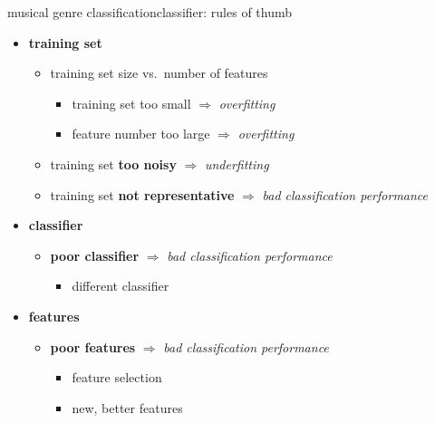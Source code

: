         \begin{frame}{musical genre classification}{classifier: rules of thumb}
            \begin{itemize}
                \item   \textbf{training set}
                    \begin{itemize}
                        \item	training set size vs.\ number of features
                            \begin{itemize}
                                \item	training set too small $\Rightarrow$ \textit{overfitting}
                                \item	feature number too large $\Rightarrow$ \textit{overfitting}
                            \end{itemize}
                        \item<2->	training set \textbf{too noisy} $\Rightarrow$ \textit{underfitting}
                        \item<3->	training set \textbf{not representative} $\Rightarrow$ \textit{bad classification performance}
                    \end{itemize}
                \item<4->   \textbf{classifier}
                    \begin{itemize}
                        \item<4->	\textbf{poor classifier} $\Rightarrow$ \textit{bad classification performance}
                            \begin{itemize}
                                \item	different classifier
                            \end{itemize}
                    \end{itemize}
                \item<5->   \textbf{features}
                    \begin{itemize}
                        \item<5->	\textbf{poor features} $\Rightarrow$ \textit{bad classification performance}
                            \begin{itemize}
                                \item	feature selection
                                \item	new, better features
                            \end{itemize}

\end{itemize}
\end{itemize}
\end{frame}
